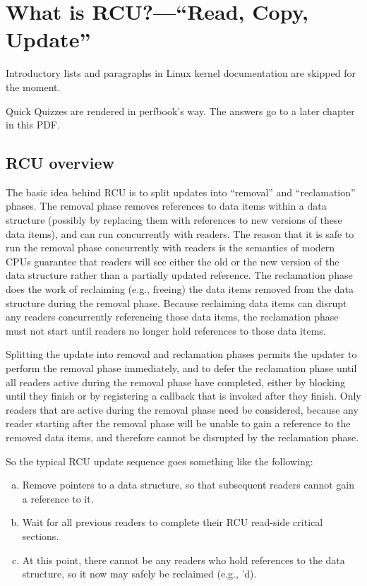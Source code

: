 \section{What is RCU?---``Read, Copy, Update''}
\label{sec:rcu:What is RCU? Read, Copy, Update}

\begin{Note}
  Introductory lists and paragraphs in Linux kernel documentation are
  skipped for the moment.

  Quick Quizzes are rendered in perfbook's way.
  The answers go to a later chapter in this PDF\@.
\end{Note}

\subsection{RCU overview}
\label{sec:rcu:RCU overview}

The basic idea behind RCU is to split updates into ``removal'' and
``reclamation'' phases.
The removal phase removes references to data items
within a data structure (possibly by replacing them with references to
new versions of these data items), and can run concurrently with readers.
The reason that it is safe to run the removal phase concurrently with
readers is the semantics of modern CPUs guarantee that readers will see
either the old or the new version of the data structure rather than a
partially updated reference.
The reclamation phase does the work of reclaiming
(e.g., freeing) the data items removed from the data structure during the
removal phase.
Because reclaiming data items can disrupt any readers
concurrently referencing those data items, the reclamation phase must
not start until readers no longer hold references to those data items.

Splitting the update into removal and reclamation phases permits the
updater to perform the removal phase immediately, and to defer the
reclamation phase until all readers active during the removal phase have
completed, either by blocking until they finish or by registering a
callback that is invoked after they finish.
Only readers that are active
during the removal phase need be considered, because any reader starting
after the removal phase will be unable to gain a reference to the removed
data items, and therefore cannot be disrupted by the reclamation phase.

So the typical RCU update sequence goes something like the following:

\begin{enumerate}[(a)]
\item	Remove pointers to a data structure, so that subsequent
	readers cannot gain a reference to it.

\item	Wait for all previous readers to complete their RCU read-side
	critical sections.

\item	At this point, there cannot be any readers who hold references
	to the data structure, so it now may safely be reclaimed
	(e.g., 'd).
\end{enumerate}

